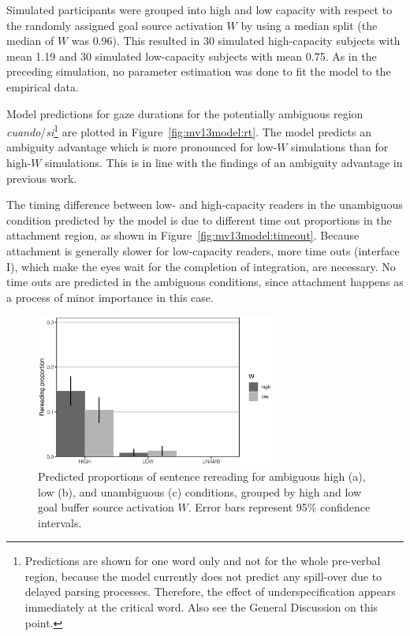 \documentclass{cambridge7A}\usepackage[]{graphicx}\usepackage[]{color}
\newenvironment{knitrout}{}{} %
\begin{document}
Simulated participants were grouped into high and low capacity with respect to the randomly assigned goal source activation $W$ by using a median split (the median of $W$ was 0.96).
This resulted in $30$ simulated high-capacity subjects with mean 1.19 and $30$ simulated low-capacity subjects with mean 0.75.
As in the preceding simulation, no parameter estimation was done to fit the model to the empirical data. 

Model predictions for gaze durations for the potentially ambiguous region \textit{cuando}/\textit{si}\footnote{Predictions are shown for one word only and not for the whole pre-verbal region, because the model currently does not predict any spill-over due to delayed parsing processes. Therefore, the effect of underspecification appears immediately at the critical word. Also see the General Discussion on this point.} 
are plotted in Figure~\ref{fig:mv13model:rt}. The model predicts an ambiguity advantage which is more pronounced for low-$W$ simulations than for high-$W$ simulations. This is in line with the findings of an ambiguity advantage in previous work. 

The timing difference between low- and high-capacity readers in the unambiguous condition predicted by the model is due to different time out proportions in the attachment region, as shown in Figure~\ref{fig:mv13model:timeout}. Because attachment is generally slower for low-capacity readers, more time outs (interface I), which make the eyes wait for the completion of integration, are necessary. No time outs are predicted in the ambiguous conditions, since attachment happens as a process of minor importance in this case.

\begin{figure}[!htbp]
  \centering
\begin{knitrout}
\color{fgcolor}

{\centering \includegraphics[width=0.7\textwidth]{figures/fig-mv13modelrer-1} 

}



\end{knitrout}
\caption[Predicted proportions of sentence rereading by source activation at ambiguous and unambiguous attachments.]{Predicted proportions of sentence rereading for ambiguous high (a), low (b), and unambiguous (c) conditions, grouped by high and low goal buffer source activation $W$. Error bars represent 95\% confidence intervals.}
  \label{fig:mv13model:rer}
\end{figure}
\end{document}

